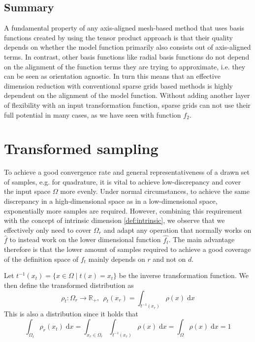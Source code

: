 \documentclass[
  a4paper,  %
  twoside,  %
  bibliography=totoc,
  headsepline,
  cleardoublepage=empty,
  parskip=half,
  draft=false
]{scrbook}
\begin{document}
\subsection{Summary}

A fundamental property of any axis-aligned mesh-based method that uses basis functions created by using the tensor product approach is that their quality depends on whether the model function primarily also consists out of axis-aligned terms.
In contrast, other basis functions like radial basis functions do not depend on the alignment of the function terms they are trying to approximate, i.e. they can be seen as orientation agnostic.
In turn this means that an effective dimension reduction with conventional sparse grids based methods is highly dependent on the alignment of the model function.
Without adding another layer of flexibility with an input transformation function, sparse grids can not use their full potential in many cases, as we have seen with function $f_2$.

\section{Transformed sampling}

To achieve a good convergence rate and general representativeness of a drawn set of samples, e.g. for quadrature, it is vital to achieve low-discrepancy and cover the input space $\Omega$ more evenly.
Under normal circumstances, to achieve the same discrepancy in a high-dimensional space as in a low-dimensional space,
exponentially more samples are required.
However, combining this requirement with the concept of intrinsic dimension \cref{def:intrinsic}, we observe that we effectively only need to cover $\Omega_r$ and adapt any operation that normally works on $\hat{f}$ to instead work on the lower dimensional function $\hat{f_t}$.
The main advantage therefore is that the lower amount of samples required to achieve a good coverage of the definition space of $f_t$ mainly depends on $r$ and not on $d$.

\begin{definition}
Let $t^{-1}(x_{t})=\{x \in \Omega \mid t(x)=x_{t}\}$ be the inverse transformation function.
We then define the transformed distribution as
\begin{equation}
\rho_t \colon \Omega_r \to \mathds{R_+}, ~~ \rho_t(x_r)=\int_{t^{-1}(x_r)} \rho(x) \; \text{d}x 
\end{equation}
This is also a distribution since it holds that
\begin{equation}
\int_{\Omega_t} \rho_r(x_t) \; \text{d}x=\int_{x_r \in \Omega_r} \int_{t^{-1}(x_r)} \rho(x) \; \text{d}x = \int_{\Omega} \rho(x) \; \text{d}x = 1
\end{equation}
\end{definition}
\end{document}
